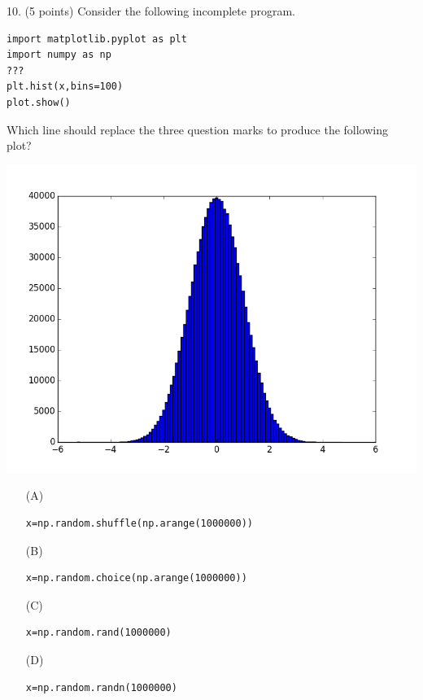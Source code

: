 \documentclass{article}
\newcounter{question}
\begin{document}
\noindent
\begin{minipage}{\textwidth}
10. (5 points)
Consider the following incomplete program.

\begin{verbatim}
import matplotlib.pyplot as plt
import numpy as np
???
plt.hist(x,bins=100)
plot.show()
\end{verbatim}

Which line should replace the three question marks to produce the following plot?

\includegraphics[scale=.5]{./img/normal.png}

\begin{enumerate}
\item[(A)]
\begin{verbatim}x=np.random.shuffle(np.arange(1000000))\end{verbatim}

\item[(B)]
\begin{verbatim}x=np.random.choice(np.arange(1000000))\end{verbatim}

\item[(C)]
\begin{verbatim}x=np.random.rand(1000000)\end{verbatim}

\item[(D)]
\begin{verbatim}x=np.random.randn(1000000)\end{verbatim}

\end{enumerate}
\end{minipage}
\vspace{10em}
\filbreak\vfil{}\vfilneg
\end{document}
